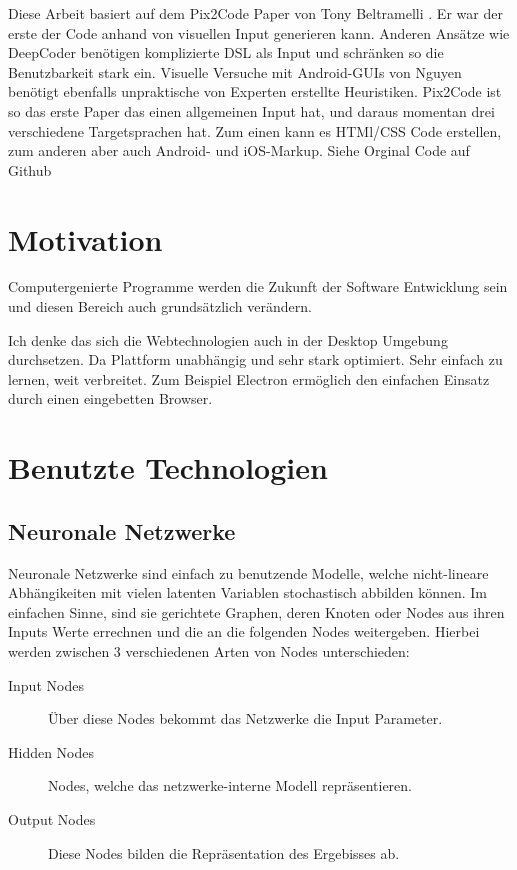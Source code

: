 \documentclass[pdftex,a4paper,halfparskip]{scrartcl}
\begin{document}
Diese Arbeit basiert auf dem Pix2Code Paper von Tony Beltramelli \cite{Beltramelli17} . Er war der erste der Code anhand von visuellen Input generieren kann. 
Anderen Ansätze wie DeepCoder \cite{DeepCoder16} benötigen komplizierte DSL als Input und schränken so die Benutzbarkeit stark ein. Visuelle Versuche mit Android-GUIs von Nguyen \cite{Nguyen15} benötigt ebenfalls unpraktische von Experten erstellte Heuristiken. Pix2Code ist so das erste Paper das einen allgemeinen Input hat, und daraus momentan drei verschiedene Targetsprachen hat. Zum einen kann es HTMl/CSS Code erstellen, zum anderen aber auch Android- und iOS-Markup. Siehe Orginal Code auf Github \cite{Beltramelli17Github}


\section{Motivation}
Computergenierte Programme werden die Zukunft der Software Entwicklung sein und diesen Bereich auch grundsätzlich verändern. 

Ich denke das sich die Webtechnologien auch in der Desktop Umgebung durchsetzen.  Da Plattform unabhängig und sehr stark optimiert. Sehr einfach zu lernen, weit verbreitet. Zum Beispiel Electron \cite{electron} ermöglich den einfachen Einsatz durch einen eingebetten Browser.



\section{Benutzte Technologien}
\subsection{Neuronale Netzwerke}
Neuronale Netzwerke sind einfach zu benutzende Modelle, welche nicht-lineare Abhängikeiten mit vielen latenten Variablen stochastisch abbilden können. Im einfachen Sinne, sind sie gerichtete Graphen, deren Knoten oder Nodes aus ihren Inputs Werte errechnen und die an die folgenden Nodes weitergeben. Hierbei werden zwischen 3 verschiedenen Arten von Nodes unterschieden:

\begin{description}
	\item[Input Nodes] Über diese Nodes bekommt das Netzwerke die Input Parameter.
	\item[Hidden Nodes] Nodes, welche das netzwerke-interne Modell repräsentieren.
	\item[Output Nodes] Diese Nodes bilden die Repräsentation des Ergebisses ab.
\end{description}
\end{document}
